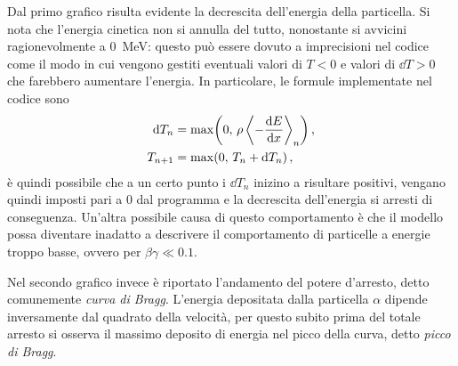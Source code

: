         Dal primo grafico risulta evidente la decrescita dell'energia della particella. Si nota che l'energia cinetica non si annulla del tutto, nonostante si avvicini ragionevolmente a \SI{0}{\mega\eV}: questo può essere dovuto a imprecisioni nel codice come il modo in cui vengono gestiti eventuali valori di $T < 0$ e valori di $\dd{T} > \num{0}$ che farebbero aumentare l'energia. In particolare, le formule implementate nel codice sono
        \begin{align*}
            \dd{T_n} &= \max\!\pqty{0,\,\rho\,{\left\langle - \dv{E}{x} \right\rangle}_n} \mycomma\\
            T_{n+1} &= \max\!\pqty{0,\,T_n + \dd{T_n}}\mycomma
        \end{align*}
        è quindi possibile che a un certo punto i $\dd{T_n}$ inizino a risultare positivi, vengano quindi imposti pari a \num{0} dal programma e la decrescita dell'energia si arresti di conseguenza. Un'altra possibile causa di questo comportamento è che il modello possa diventare inadatto a descrivere il comportamento di particelle a energie troppo basse, ovvero per $\beta\gamma \ll 0.1$.

        Nel secondo grafico invece è riportato l'andamento del potere d'arresto, detto comunemente \emph{curva di Bragg}. L'energia depositata dalla particella $\alpha$ dipende inversamente dal quadrato della velocità, per questo subito prima del totale arresto si osserva il massimo deposito di energia nel picco della curva, detto \emph{picco di Bragg}.